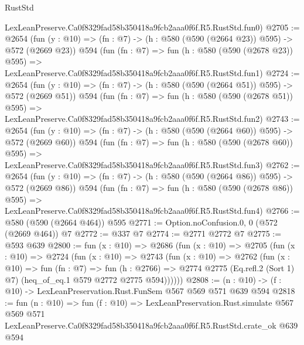 \begin{lexlean}{RustStd}
\begin{coremodule}
    LexLeanPreserve.Ca0f8329fad58b350418a9fcb2aaa0f6f.R5.RustStd.fun0)
@2705 := @2654
    (fun (y : @10) => (fn : @7) -> (h : @580 (@590 (@2664 @23)) @595) -> @572 (@2669 @23))
    @594
    (fun (fn : @7) =>
    fun (h : @580 (@590 (@2678 @23)) @595) =>
    LexLeanPreserve.Ca0f8329fad58b350418a9fcb2aaa0f6f.R5.RustStd.fun1)
@2724 := @2654
    (fun (y : @10) => (fn : @7) -> (h : @580 (@590 (@2664 @51)) @595) -> @572 (@2669 @51))
    @594
    (fun (fn : @7) =>
    fun (h : @580 (@590 (@2678 @51)) @595) =>
    LexLeanPreserve.Ca0f8329fad58b350418a9fcb2aaa0f6f.R5.RustStd.fun2)
@2743 := @2654
    (fun (y : @10) => (fn : @7) -> (h : @580 (@590 (@2664 @60)) @595) -> @572 (@2669 @60))
    @594
    (fun (fn : @7) =>
    fun (h : @580 (@590 (@2678 @60)) @595) =>
    LexLeanPreserve.Ca0f8329fad58b350418a9fcb2aaa0f6f.R5.RustStd.fun3)
@2762 := @2654
    (fun (y : @10) => (fn : @7) -> (h : @580 (@590 (@2664 @86)) @595) -> @572 (@2669 @86))
    @594
    (fun (fn : @7) =>
    fun (h : @580 (@590 (@2678 @86)) @595) =>
    LexLeanPreserve.Ca0f8329fad58b350418a9fcb2aaa0f6f.R5.RustStd.fun4)
@2766 := @580 (@590 (@2664 @464)) @595
@2771 := Option.noConfusion.{0, 0} (@572 (@2669 @464)) @7
@2772 := @337 @7
@2774 := @2771 @2772 @7
@2775 := @593 @639
@2800 := fun (x : @10) =>
  @2686
    (fun (x : @10) =>
    @2705
      (fun (x : @10) =>
      @2724
        (fun (x : @10) =>
        @2743
          (fun (x : @10) =>
          @2762
            (fun (x : @10) =>
            fun (fn : @7) =>
            fun (h : @2766) =>
            @2774 @2775 (Eq.refl.{2} (Sort 1) @7) (heq_of_eq.{1} @579 @2772 @2775 @594))))))
@2808 := (n : @10) -> (f : @10) -> LexLeanPreservation.Rust.FunSem @567 @569 @571 @639 @594
@2818 := fun (n : @10) =>
  fun (f : @10) =>
  LexLeanPreservation.Rust.simulate
    @567
    @569
    @571
    LexLeanPreserve.Ca0f8329fad58b350418a9fcb2aaa0f6f.R5.RustStd.crate_ok
    @639
    @594
\end{coremodule}
\end{lexlean}

